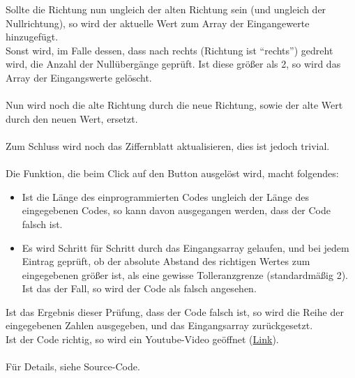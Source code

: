 Sollte die Richtung nun ungleich der alten Richtung sein (und ungleich der Nullrichtung), so wird der aktuelle Wert zum Array der Eingangewerte hinzugefügt. \\
Sonst wird, im Falle dessen, dass nach rechts (Richtung ist \enquote{rechts}) gedreht wird, die Anzahl der Nullübergänge geprüft. Ist diese größer als 2, so wird das Array der Eingangswerte gelöscht.\\
\\
Nun wird noch die alte Richtung durch die neue Richtung, sowie der alte Wert durch den neuen Wert, ersetzt.\\
\\
Zum Schluss wird noch das Ziffernblatt aktualisieren, dies ist jedoch trivial.\\
\\
Die Funktion, die beim Click auf den Button ausgelöst wird, macht folgendes:
\begin{itemize}
\item Ist die Länge des einprogrammierten Codes ungleich der Länge des eingegebenen Codes, so kann davon ausgegangen werden, dass der Code falsch ist.
\item Es wird Schritt für Schritt durch das Eingangsarray gelaufen, und bei jedem Eintrag geprüft, ob der absolute Abstand des richtigen Wertes zum eingegebenen größer ist, als eine gewisse Tolleranzgrenze (standardmäßig 2). Ist das der Fall, so wird der Code als falsch angesehen.
\end{itemize}
Ist das Ergebnis dieser Prüfung, dass der Code falsch ist, so wird die Reihe der eingegebenen Zahlen ausgegeben, und das Eingangsarray zurückgesetzt.\\
Ist der Code richtig, so wird ein Youtube-Video geöffnet (\href{http://www.youtube.com/watch?v=aObeQUNELm4}{Link}).\\
\\
Für Details, siehe Source-Code.